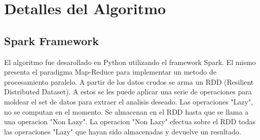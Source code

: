 \documentclass[a4paper,10pt]{article}
\begin{document}
	

	\section{Detalles del Algoritmo}
	
	\subsection{Spark Framework}
	El algoritmo fue desarollado en Python utilizando el framework Spark. El mismo presenta el paradigma Map-Reduce para implementar un metodo de procesamiento paralelo. A partir de los datos crudos se arma un RDD (Resilient Distributed Dataset). A estos se les puede aplicar una serie de operaciones para moldear el set de datos para extraer el analisis deseado. Las operaciones "Lazy", no se computan en el momento. Se almacenan en el RDD hasta que se llama a una operacion "Non Lazy". La operacion "Non Lazy" efectua sobre el RDD todas las operaciones "Lazy" que hayan sido almacenadas y devuelve un resultado.
	
\end{document}
